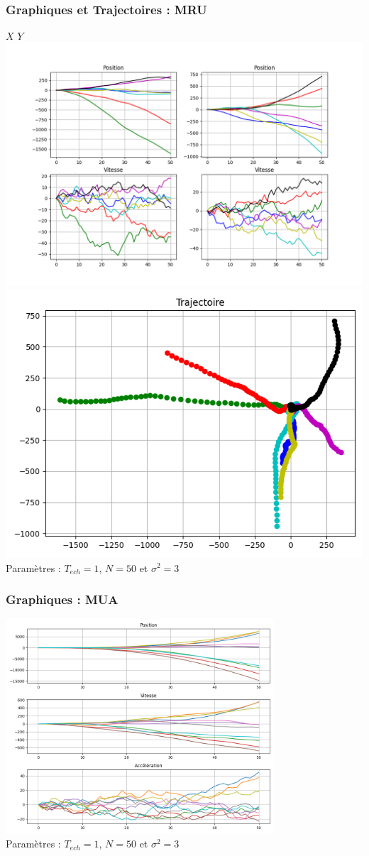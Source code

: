 \documentclass{beamer}
\begin{document}
\begin{frame}
  \frametitle{Graphiques et Trajectoires : MRU}
  \hspace{1,7cm} $X$ \hspace{3cm} $Y$
  \includegraphics[width=.65\textwidth]{images/MRU_Générations.png}\hfill
  \includegraphics[width=.35\textwidth]{images/MRU_Trajectoires.png} 
  Paramètres : $T_{ech} = 1$, $N = 50$ et $\sigma^{2} = 3$
\end{frame}

\begin{frame}
  \frametitle{Graphiques : MUA}
  \includegraphics[width=0.75\textwidth]{images/MUA_Générations.png} \\
  Paramètres : $T_{ech} = 1$, $N = 50$ et $\sigma^{2} = 3$
\end{frame}
\end{document}
